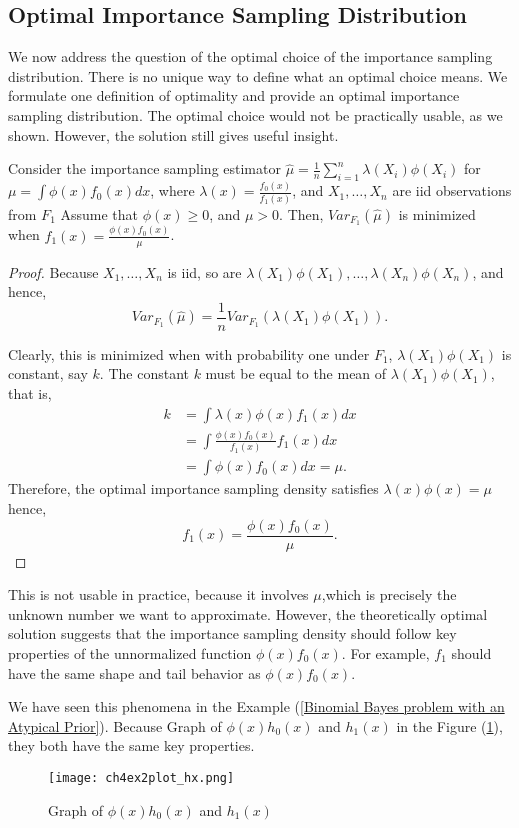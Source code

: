 \subsection{Optimal Importance Sampling Distribution}
We now address the question of the optimal choice of the importance sampling
distribution. There is no unique way to define what an optimal choice means. We
formulate one definition of optimality and provide an optimal importance sampling
distribution. The optimal choice would not be practically usable, as we shown.
However, the solution still gives useful insight.

\begin{theorem}
	Consider the importance sampling estimator $\hat{\mu} = \frac{1}{n}\sum_{i=1}^{n} \lambda(X_i)\phi(X_i) $ for $\mu=\int \phi(x)f_0(x)dx $, where
	$\lambda(x) =\frac{f_0(x)}{f_1(x)}$, and $X_1,\ldots,X_n$ are iid observations from $F_1$
	Assume that $\phi(x)\ge0$, and $\mu>0$. Then, $Var_{F_1}(\hat{\mu})$ is
	minimized when $f_1(x)=\frac{\phi(x)f_0(x)}{\mu}$.
\end{theorem}
\begin{proof}
	Because $X_1,\ldots,X_n$ is iid, so are $\lambda(X_1)\phi(X_1),\ldots,\lambda(X_n)\phi(X_n)$, and hence,
	\[
		Var_{F_1}(\hat{\mu}) = \frac{1}{n} Var_{F_1}(\lambda(X_1)\phi(X_1))
		.
	\]

	Clearly, this is minimized when with probability one under $F_1$, $\lambda(X_1)\phi(X_1)$
	is constant, say $k$. The constant $k$ must be equal to the mean of $\lambda(X_1)\phi(X_1)$, that is,
	\begin{align*}
		k & = \int \lambda(x)\phi(x)f_1(x)dx              \\
		  & = \int \frac{\phi(x)f_0(x)}{f_1(x)} f_1(x) dx \\
		  & = \int \phi(x)f_0(x)dx = \mu.
	\end{align*}
	Therefore, the optimal importance sampling density satisfies $\lambda(x)\phi(x) = \mu$
	hence,
	\[
		f_1(x) = \frac{\phi(x)f_0(x)}{\mu}.
	\]
\end{proof}
This is not usable in practice, because it involves $\mu$,which is precisely the unknown number we want to approximate.
However, the theoretically optimal solution
suggests that the importance sampling density should follow key properties of the
unnormalized function $\phi(x)f_0(x)$.
For example, $f_1$ should have the same shape and tail behavior as $\phi(x)f_0(x)$.

We have seen this phenomena in the Example (\ref{Binomial Bayes problem with an Atypical Prior}).
Because Graph of $\phi(x)h_0(x)$ and $h_1(x)$ in the Figure (\ref{fig:ch4ex2plothx}), they both have the same key properties.   
\begin{figure}[H]
    \centering
    \texttt{[image: ch4ex2plot\_hx.png]}
    \caption{Graph of $\phi(x)h_0(x)$ and $h_1(x)$}
    \label{fig:ch4ex2plothx}
\end{figure}
